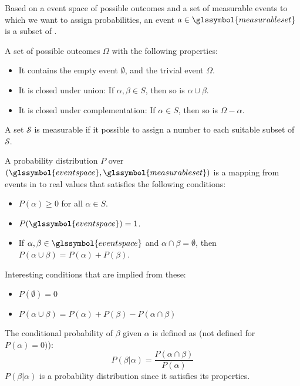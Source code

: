 {%
  Based on a \gls{event space} of possible outcomes  and a set of measurable events  to which we want to assign probabilities, an event $a \in \glssymbol{measurable set}$ is a subset of .\\
}

{%
  A set of possible outcomes $\Omega$ with the following properties:
  \begin{itemize}
    \item It contains the empty event $\emptyset$, and the trivial event $\Omega$.
    \item It is closed under union: If $\alpha, \beta \in S$, then so is $\alpha \cup \beta$.
    \item It is closed under complementation: If $\alpha \in S$, then so is $\Omega - \alpha$.
  \end{itemize}
}

{%
  A set $\mathcal{S}$ is measurable if it possible to assign a number to each suitable subset of $\mathcal{S}$.
}

{%
  A probability distribution $P$ over $(\glssymbol{event space},\glssymbol{measurable set})$ is a mapping from events in  to real values that satisfies the following conditions:
  \begin{itemize}
    \item $P(\alpha)\geq 0 $ for all $ \alpha \in S$.
    \item $P(\glssymbol{event space})=1$.
    \item If $\alpha,\beta\in \glssymbol{event space}$ and $\alpha\cap\beta = \emptyset$, then $P(\alpha\cup\beta)=P(\alpha)+P(\beta)$.
  \end{itemize}
  Interesting conditions that are implied from these:
  \begin{itemize}
    \item $P(\emptyset)=0$
    \item $P(\alpha\cup\beta)=P(\alpha)+P(\beta)-P(\alpha\cap\beta)$
  \end{itemize}
}

{%
  The conditional probability of $\beta$ given $\alpha$ is defined as (not defined for $P(\alpha)=0)$):
  \begin{equation*}
    P(\beta|\alpha)=\frac{P(\alpha\cap\beta)}{P(\alpha)}
  \end{equation*}
  $P(\beta|\alpha)$ is a \gls{probability distribution} since it satisfies its properties.
}

